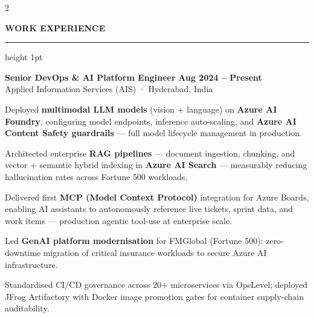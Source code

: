 \documentclass[10pt, a4paper]{article}
\newcommand{\mainHeading}[1]{%
  \vspace{2pt}%
  {\fontsize{6.8pt}{6.8pt}\selectfont
   \textcolor{ruleLine}{\bfseries\MakeUppercase{#1}}}%
  \vspace{2pt}%
  \textcolor{ruleLine}{\hrule height 1pt}%
  \vspace{6pt}%
}
\newcommand{\jobentry}[4]{%
  \vspace{1pt}%
  {\fontsize{9.5pt}{9.5pt}\selectfont
   \textbf{\textcolor{mainDark}{#1}} \hfill
   {\fontsize{7.5pt}{7.5pt}\selectfont\textcolor{jobDateCol}{\bfseries#2}}}\\[-1pt]%
  {\fontsize{8pt}{8pt}\selectfont\textcolor{companyCol}{#3}}%
  \vspace{3pt}%
  #4
  \vspace{8pt}%
}
\begin{document}
\begin{paracol}{2}
\begin{minipage}{\linewidth-14pt}
\vspace{10pt}

\mainHeading{Work Experience}

\jobentry%
  {Senior DevOps \& AI Platform Engineer}%
  {Aug 2024 – Present}%
  {Applied Information Services (AIS) \textcolor{sideMuted}{·} Hyderabad, India}%
  {%
    \begin{cvbullets}
      \item[\textcolor{bulletCol}{\scriptsize$\blacktriangleright$}]
        Deployed \textbf{multimodal LLM models} (vision + language) on \textbf{Azure AI Foundry},
        configuring model endpoints, inference auto-scaling, and \textbf{Azure AI Content Safety
        guardrails} — full model lifecycle management in production.
      \item[\textcolor{bulletCol}{\scriptsize$\blacktriangleright$}]
        Architected enterprise \textbf{RAG pipelines} — document ingestion, chunking, and
        vector + semantic hybrid indexing in \textbf{Azure AI Search} — measurably reducing
        hallucination rates across Fortune 500 workloads.
      \item[\textcolor{bulletCol}{\scriptsize$\blacktriangleright$}]
        Delivered first \textbf{MCP (Model Context Protocol)} integration for Azure Boards,
        enabling AI assistants to autonomously reference live tickets, sprint data, and work
        items — production agentic tool-use at enterprise scale.
      \item[\textcolor{bulletCol}{\scriptsize$\blacktriangleright$}]
        Led \textbf{GenAI platform modernisation} for FMGlobal (Fortune 500): zero-downtime
        migration of critical insurance workloads to secure Azure AI infrastructure.
      \item[\textcolor{bulletCol}{\scriptsize$\blacktriangleright$}]
        Standardised CI/CD governance across 20+ microservices via OpsLevel; deployed JFrog
        Artifactory with Docker image promotion gates for container supply-chain auditability.
    \end{cvbullets}%
  }


\end{minipage}
\end{paracol}
\end{document}
